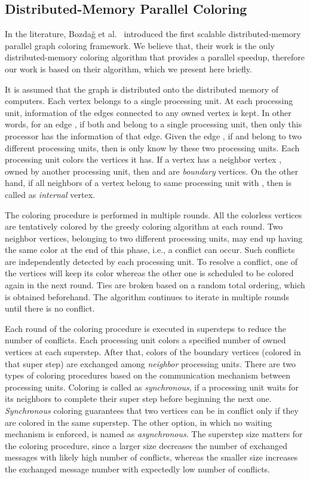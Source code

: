 \documentclass{article}
\begin{document}
\subsection{Distributed-Memory Parallel Coloring}
\label{sec:jpdc}

In the literature, Bozda\u{g} et al.~\cite{BGMBC-jpdc} introduced the first
scalable distributed-memory parallel graph coloring framework. We believe that, their
work is the only distributed-memory coloring algorithm that provides
a parallel speedup, therefore our work is based on their algorithm, which we
present here briefly.

It is assumed that the graph is distributed onto the distributed
memory of computers. Each vertex belongs to a single processing unit. 
At each processing unit, information of the edges connected to any owned vertex
is kept. In other words, for an edge , if both  and  belong to
a single processing unit, then only this processor has the information of that edge.
Given the edge , if  and  belong to two different
processing units, then  is only know by these two processing units.
Each processing unit colors the vertices it has. If a vertex  has a neighbor
vertex , owned by another processing unit, then  and  are {\em
  boundary} vertices. On the other hand, if all neighbors of a vertex 
belong to same processing unit with , then  is called as {\em internal} vertex.

The coloring procedure is performed in multiple rounds. All the colorless vertices are
tentatively colored by the greedy coloring algorithm at each round.
Two neighbor vertices, belonging to two different processing units, may
end up having the same color at the end of this phase, i.e., a conflict can occur.
Such conflicts are independently detected by each processing unit. To resolve a conflict,
one of the vertices will keep its color whereas the other one is scheduled to be
colored again in the next round. Ties are broken based on a random total ordering,
which is obtained beforehand. The algorithm continues to iterate in multiple rounds until there is no conflict.

Each round of the coloring procedure is executed in supersteps to reduce the number of conflicts.
Each processing unit colors a specified number of owned vertices at
each superstep. After that, colors of the boundary vertices (colored in that super step)
are exchanged among {\em neighbor} processing units. There are two types of
coloring procedures based on the communication mechanism between processing units.
Coloring is called as {\em synchronous}, if a processing unit waits for its
neighbors to complete their super step before beginning the next one. {\em Synchronous}
coloring guarantees that two vertices can be in conflict only if they are colored
in the same superstep. The other option, in which no waiting mechanism is enforced, is named
as {\em asynchronous}. The superstep size matters for the coloring procedure, since a larger
size decreases the number of exchanged messages with likely high number of conflicts, whereas
the smaller size increases the exchanged message number with expectedly low number of conflicts.
\end{document}
